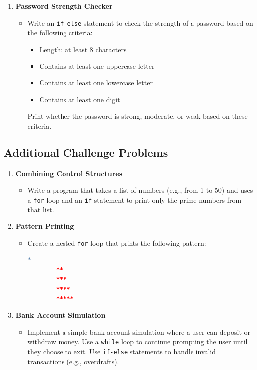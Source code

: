 \documentclass[10pt]{book}
\begin{document}
\begin{enumerate}
    \item \textbf{Password Strength Checker}
    \begin{itemize}
        \item Write an \texttt{if-else} statement to check the strength of a password based on the following criteria:
        \begin{itemize}
            \item Length: at least 8 characters
            \item Contains at least one uppercase letter
            \item Contains at least one lowercase letter
            \item Contains at least one digit
        \end{itemize}
        Print whether the password is strong, moderate, or weak based on these criteria.
    \end{itemize}
\end{enumerate}

\subsection*{Additional Challenge Problems}

\begin{enumerate}
    \item \textbf{Combining Control Structures}
    \begin{itemize}
        \item Write a program that takes a list of numbers (e.g., from 1 to 50) and uses a \texttt{for} loop and an \texttt{if} statement to print only the prime numbers from that list.
    \end{itemize}

    \item \textbf{Pattern Printing}
    \begin{itemize}
        \item Create a nested \texttt{for} loop that prints the following pattern:
        \begin{lstlisting}[language=R]
        *
        **
        ***
        ****
        *****
        \end{lstlisting}
    \end{itemize}

    \item \textbf{Bank Account Simulation}
    \begin{itemize}
        \item Implement a simple bank account simulation where a user can deposit or withdraw money. Use a \texttt{while} loop to continue prompting the user until they choose to exit. Use \texttt{if-else} statements to handle invalid transactions (e.g., overdrafts).
    \end{itemize}
\end{enumerate}
\end{document}
